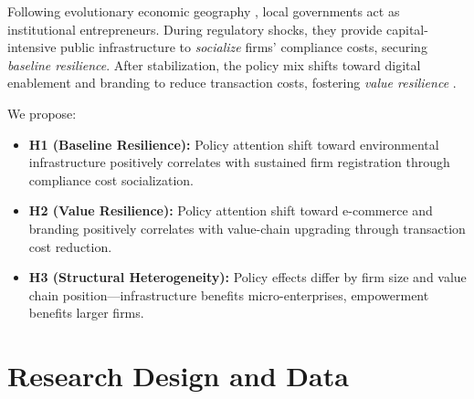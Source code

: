 \documentclass[sustainability,article,submit,moreauthors,pdftex]{mdpi}
\begin{document}
Following evolutionary economic geography \citep{Sotarauta2017}, local governments act as institutional entrepreneurs. During regulatory shocks, they provide capital-intensive public infrastructure to \emph{socialize} firms' compliance costs, securing \emph{baseline resilience}. After stabilization, the policy mix shifts toward digital enablement and branding to reduce transaction costs, fostering \emph{value resilience} \citep{Tian2023}.

We propose:
\begin{itemize}
  \item \textbf{H1 (Baseline Resilience):} Policy attention shift toward environmental infrastructure positively correlates with sustained firm registration through compliance cost socialization.
  \item \textbf{H2 (Value Resilience):} Policy attention shift toward e-commerce and branding positively correlates with value-chain upgrading through transaction cost reduction.
  \item \textbf{H3 (Structural Heterogeneity):} Policy effects differ by firm size and value chain position---infrastructure benefits micro-enterprises, empowerment benefits larger firms.
\end{itemize}
\section{Research Design and Data}\label{sec:method}
\end{document}
